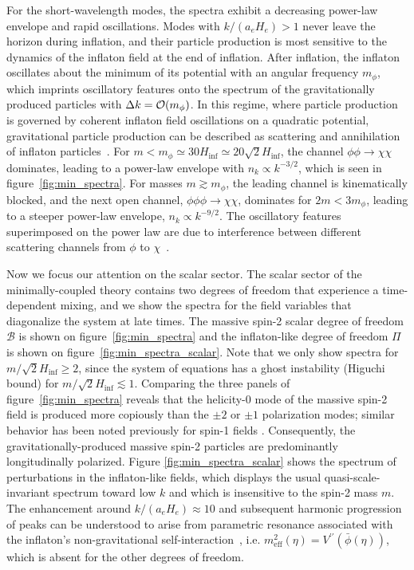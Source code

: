 \documentclass[11pt,a4paper]{article}
\newcommand{\fref}[1]{figure~\ref{#1}}
\begin{document}
For the short-wavelength modes, the spectra exhibit a decreasing power-law envelope and rapid oscillations.  Modes with $k / (a_e H_e) > 1$ never leave the horizon during inflation, and their particle production is most sensitive to the dynamics of the inflaton field at the end of inflation.  After inflation, the inflaton oscillates about the minimum of its potential with an angular frequency $m_\phi$, which imprints oscillatory features onto the spectrum of the gravitationally produced particles with $\Delta k = \order{m_\phi}$.  In this regime, where particle production is governed by coherent inflaton field oscillations on a quadratic potential, gravitational particle production can be described as scattering and annihilation of inflaton particles~\cite{Ema:2018ucl,Chung:2018ayg,Basso:2021whd,Kaneta:2022gug,Basso:2022tpd}.  For $m < m_\phi\simeq 30H_\mathrm{inf} \simeq 20\sqrt{2}H_\mathrm{inf}$, the channel $\phi \phi \to \chi \chi$ dominates, leading to a power-law envelope with $n_k \propto k^{-3/2}$, which is seen in \fref{fig:min_spectra}.  For masses $m \gtrsim m_\phi$, the leading channel is kinematically blocked, and the next open channel, $\phi\phi\phi \to \chi\chi$, dominates for $2m<3m_\phi$, leading to a steeper power-law envelope, $n_k \propto k^{-9/2}$.  The oscillatory features superimposed on the power law are due to interference between different scattering channels from $\phi$ to $\chi$~\cite{Basso:2022tpd}. 

Now we focus our attention on the scalar sector.  The scalar sector of the minimally-coupled theory contains two degrees of freedom that experience a time-dependent mixing, and we show the spectra for the field variables that diagonalize the system at late times.  The massive spin-2 scalar degree of freedom $\mathcal{B}$ is shown on \fref{fig:min_spectra} and the inflaton-like degree of freedom $\Pi$ is shown on \fref{fig:min_spectra_scalar}.  Note that we only show spectra for $m / \sqrt{2} H_\mathrm{inf} \geq 2$, since the system of equations has a ghost instability (Higuchi bound) for $m / \sqrt{2} H_\mathrm{inf} \lesssim 1$.  Comparing the three panels of \fref{fig:min_spectra} reveals that the helicity-0 mode of the massive spin-2 field is produced more copiously than the $\pm 2$ or $\pm 1$ polarization modes; similar behavior has been noted previously for spin-1 fields \cite{Graham:2015rva}.  Consequently, the gravitationally-produced massive spin-2 particles are predominantly longitudinally polarized.  Figure \ref{fig:min_spectra_scalar} shows the spectrum of perturbations in the inflaton-like fields, which displays the usual quasi-scale-invariant spectrum toward low $k$ and which is insensitive to the spin-2 mass $m$.  The enhancement around $k/(a_e H_e) \approx 10$ and subsequent harmonic progression of peaks can be understood to arise from parametric resonance associated with the inflaton's non-gravitational self-interaction~\cite{Amin:2014eta}, i.e. $m_\mathrm{eff}^2(\eta) = V^{\prime\prime}(\bar{\phi}(\eta))$, which is absent for the other degrees of freedom.  
\end{document}
